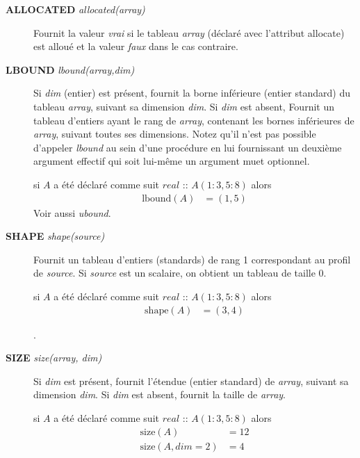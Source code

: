 \documentclass[a4paper,twoside]{article}
\begin{document}
\begin{description}
\item[\textbf{ALLOCATED} \emph{allocated(array)}] Fournit la valeur \emph{vrai} si le tableau \emph{array} (déclaré avec l'attribut allocate) est alloué et la valeur \emph{faux} dans le cas contraire.

\item[\textbf{LBOUND} \emph{lbound(array,dim)}] Si \emph{dim} (entier) est présent, fournit la borne inférieure (entier standard) du tableau \emph{array}, suivant sa dimension \emph{dim}. Si \emph{dim} est absent, Fournit un tableau d'entiers ayant le rang de \emph{array}, contenant les bornes inférieures de \emph{array}, suivant toutes ses dimensions. Notez qu'il n'est pas possible d'appeler \emph{lbound} au sein d'une procédure en lui fournissant un deuxième argument effectif qui soit lui-même un argument muet optionnel.
\begin{exemple}
si $A$ a été déclaré comme suit 
$real$ :: $A(1:3,5:8)$ alors 
\begin{align}
\mathrm{lbound}(A)  &= (1,5)
\end{align}
Voir aussi \emph{ubound}.
\end{exemple}

\item[\textbf{SHAPE} \emph{shape(source)}] Fournit un tableau d'entiers (standards) de rang 1 correspondant au profil de \emph{source}. Si \emph{source} est un scalaire, on obtient un tableau de taille 0. 
\begin{exemple}
si $A$ a été déclaré comme suit 
$real$ :: $A(1:3,5:8)$ alors
\begin{align}
\mathrm{shape}(A)  &= (3,4)
\end{align}
\end{exemple}.

\item[\textbf{SIZE} \emph{size(array, dim)}] Si \emph{dim} est présent, fournit l'étendue (entier standard) de \emph{array}, suivant sa dimension \emph{dim}. Si \emph{dim} est absent, fournit la taille de \emph{array}. 
\begin{exemple}
si $A$ a été déclaré comme suit 
$real$ :: $A(1:3,5:8)$ alors
\begin{align}
\mathrm{size}(A) &= 12\\
\mathrm{size}(A, dim=2) &= 4
\end{align}
\end{exemple}


\end{description}
\end{document}
